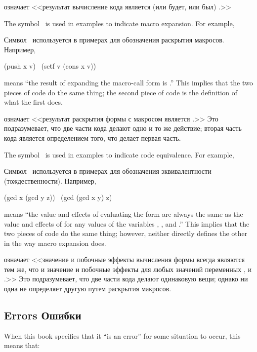 означает <<результат вычисление кода  является (или будет, или был) .>>

The symbol \EX\ is used in examples to indicate macro expansion.
For example,

Символ \EX\ используется в примерах для обозначения раскрытия макросов.
Например,
\begin{lisp}
(push x v) \EX\ (setf v (cons x v))
\end{lisp}
means ``the result of expanding the macro-call form 
is .''  This implies that the two pieces
of code do the same thing; the second piece of code is
the definition of what the first does.

означает <<результат раскрытия формы с макросом 
является .>> Это подразумевает, что две части кода
делают одно и то же действие; вторая часть кода является определением того, что
делает первая часть.

The symbol \EQ\ is used in examples to indicate code equivalence.
For example,

Символ \EQ\ используется в примерах для обозначения эквивалентности
(тождественности).
Например,
\begin{lisp}
(gcd x (gcd y z)) \EQ\ (gcd (gcd x y) z)
\end{lisp}
means ``the value and effects of evaluating the form
 are always the same as the value
and effects of
 for any values of the
variables , , and .''
This implies that the two pieces
of code do the same thing; however, neither directly defines
the other in the way macro expansion does.

означает <<значение и побочные эффекты вычисления формы  всегда
являются тем же, что и значение и побочные эффекты  для любых
значений переменных ,  и .>>
Это подразумевает, что две части кода делают одинаковую вещи; однако ни одна не
определяет другую путем раскрытия макросов.

\subsection{Errors Ошибки}
\label{INTRO-ERRORS}

When this book specifies that it ``is an error'' for some situation
to occur, this means that:

